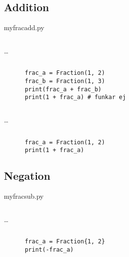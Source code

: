 \subsection{Addition}

\begin{frame}
  myfrac\textunderscore add.py
\end{frame}

\begin{frame}[fragile]
  \inputminted[linenos,firstline=3,lastline=3]{python}{examples/myfrac_add.py}
  \dots
  \inputminted[autogobble=false,linenos,firstline=31,lastline=40]{python}{examples/myfrac_add.py}

  \begin{example}
    \begin{verbatim}
      frac_a = Fraction(1, 2)
      frac_b = Fraction(1, 3)
      print(frac_a + frac_b)
      print(1 + frac_a) # funkar ej
    \end{verbatim}
  \end{example}
\end{frame}

\begin{frame}[fragile]
  \inputminted[linenos,firstline=3,lastline=3]{python}{examples/myfrac_add.py}
  \dots
  \inputminted[autogobble=false,linenos,firstline=41,lastline=43]{python}{examples/myfrac_radd.py}

  \begin{example}
    \begin{verbatim}
      frac_a = Fraction(1, 2)
      print(1 + frac_a)
    \end{verbatim}
  \end{example}
\end{frame}

\subsection{Negation}

\begin{frame}
  myfrac\textunderscore sub.py
\end{frame}

\begin{frame}[fragile]
  \inputminted[linenos,firstline=3,lastline=3]{python}{examples/myfrac_sub.py}
  \dots
  \inputminted[autogobble=false,linenos,firstline=44,lastline=45]{python}{examples/myfrac_sub.py}

  \begin{example}
    \begin{verbatim}
      frac_a = Fraction{1, 2}
      print(-frac_a)
    \end{verbatim}
  \end{example}
\end{frame}


